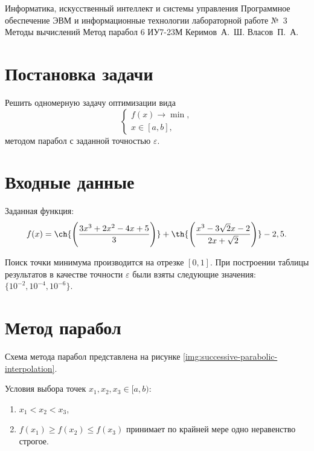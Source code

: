 \documentclass{bmstu-gost-7-32}
\begin{document}
\makereporttitle
	{Информатика, искусственный интеллект и системы управления} %
	{Программное обеспечение ЭВМ и информационные технологии} %
	{лабораторной работе №~3} %
	{Методы вычислений} %
	{Метод парабол} %
	{6} %
	{ИУ7-23М} %
	{Керимов~А.~Ш.} %
	{Власов~П.~А.} %

\section*{Постановка задачи}

Решить одномерную задачу оптимизации вида
\begin{equation}
	\begin{cases}
		f(x) \to \min, \\
		x \in [a, b],
	\end{cases}
\end{equation}
методом парабол с заданной точностью $\varepsilon$.

\section*{Входные данные}

Заданная функция:
\begin{equation}
	f(x) = \ch{\left(\frac{3x^3 + 2x^2 - 4x + 5}{3}\right)} + \th{\left(\frac{x^3 - 3\sqrt2x - 2}{2x + \sqrt2}\right)} - 2,5.
\end{equation}

Поиск точки минимума производится на отрезке $[0, 1]$.
При построении таблицы результатов в качестве точности $\varepsilon$ были взяты следующие значения: $\{10^{-2}, 10^{-4}, 10^{-6}\}$.

\section*{Метод парабол}

Схема метода парабол представлена на рисунке \ref{img:successive-parabolic-interpolation}.

Условия выбора точек $x_1, x_2, x_3 \in [a, b)$:
\begin{enumerate}
	\item $x_1 < x_2 < x_3$,
	\item $f(x_1) \geqslant f(x_2) \leqslant f(x_3)$ принимает по крайней мере одно неравенство строгое.
\end{enumerate}
\end{document}
